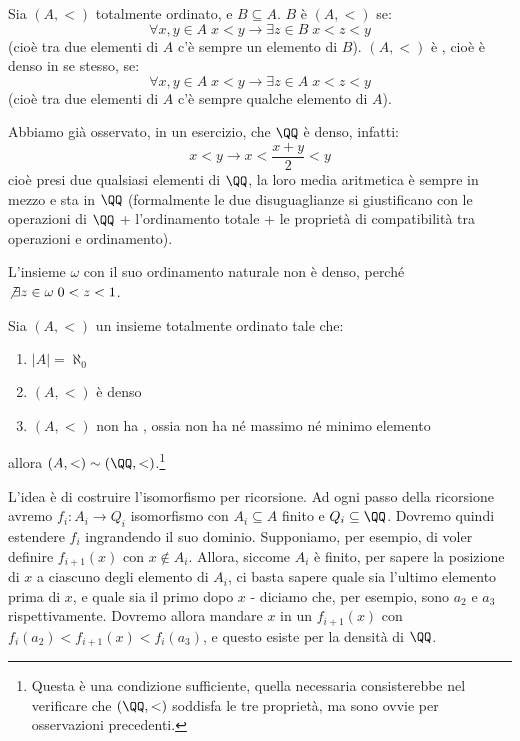 \documentclass[11pt]{scrartcl}
\begin{document}
\begin{definition}[Densità]
	Sia $(A,<)$ totalmente ordinato, e $B \subseteq A$. $B$ è  $(A,<)$ se:
	\[ \forall x,y \in A \; x < y \rightarrow \exists z \in B \; x < z < y
		\]
	(cioè tra due elementi di $A$ c'è sempre un elemento di $B$). $(A, <)$ è , cioè è denso in se stesso, se:
	\[ \forall x,y \in A \; x < y \rightarrow \exists z \in A \; x < z < y
		\]
		(cioè tra due elementi di $A$ c'è sempre qualche elemento di $A$).
\end{definition}

\begin{example}
	Abbiamo già osservato, in un esercizio, che $\QQ$ è denso, infatti:
	\[ x < y \rightarrow x < \frac{x+y}{2} < y
		\]
	cioè presi due qualsiasi elementi di $\QQ$, la loro media aritmetica è sempre in mezzo e sta in $\QQ$ (formalmente le due disuguaglianze si giustificano con le operazioni di $\QQ$ + l'ordinamento totale + le proprietà 
	di compatibilità tra operazioni e ordinamento).
\end{example}

\begin{notexample}
	L'insieme $\omega$ con il suo ordinamento naturale non è denso, perché $\not\exists z \in \omega \; 0 < z < 1$.
\end{notexample}

\begin{theorem}
	\label{isoCantor}
	Sia $(A,<)$ un insieme totalmente ordinato tale che:
	\begin{enumerate}[1.]
		\item $|A| = \aleph_0$
		\item $(A,<)$ è denso
		\item $(A,<)$ non ha , ossia non ha né massimo né minimo elemento
	\end{enumerate}
	allora $(A,<)\sim(\QQ,<)$.\footnote{Questa è una condizione sufficiente, quella necessaria consisterebbe nel verificare che $(\QQ,<)$ soddisfa le tre proprietà, ma sono ovvie per osservazioni precedenti.}
\end{theorem}

L'idea è di costruire l'isomorfismo per ricorsione. Ad ogni passo della ricorsione avremo $f_i : A_i \rightarrow Q_i$ isomorfismo con $A_i \subseteq A$ finito 
e $Q_i \subseteq \QQ$. Dovremo quindi estendere $f_i$ ingrandendo il suo dominio.
Supponiamo, per esempio, di voler definire $f_{i+1}(x)$ con $x \not \in A_i$. Allora, siccome $A_i$ è finito, per sapere la posizione di $x$ a ciascuno degli elemento di $A_i$, ci basta sapere quale sia l'ultimo elemento prima di $x$,
e quale sia il primo dopo $x$ - diciamo che, per esempio, sono $a_2$  e $a_3$ rispettivamente. Dovremo allora mandare $x$ in un $f_{i+1}(x)$ con $f_i(a_2) < f_{i+1}(x) < f_i(a_3)$, e questo esiste per la densità di $\QQ$.
\end{document}

